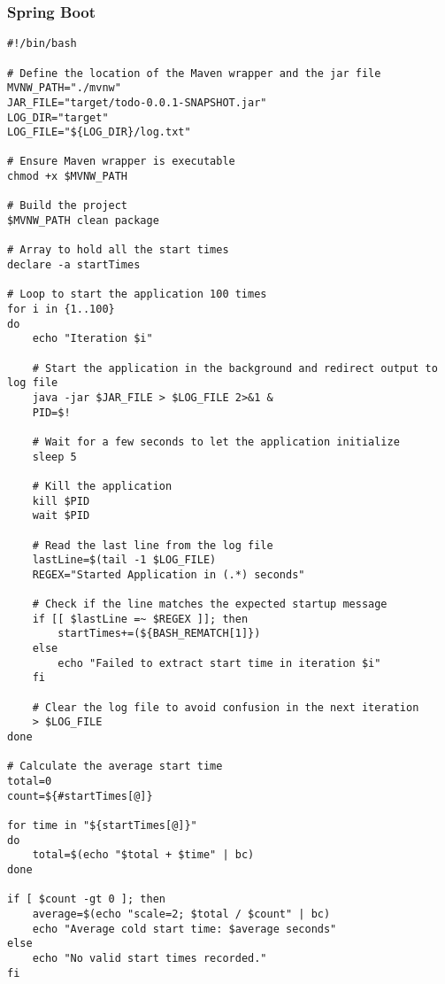 \documentclass[a4paper,titlepage]{article}
\begin{document}
\subsubsection{Spring Boot}
\begin{lstlisting}
#!/bin/bash

# Define the location of the Maven wrapper and the jar file
MVNW_PATH="./mvnw"
JAR_FILE="target/todo-0.0.1-SNAPSHOT.jar"
LOG_DIR="target"
LOG_FILE="${LOG_DIR}/log.txt"

# Ensure Maven wrapper is executable
chmod +x $MVNW_PATH

# Build the project
$MVNW_PATH clean package

# Array to hold all the start times
declare -a startTimes

# Loop to start the application 100 times
for i in {1..100}
do
	echo "Iteration $i"

	# Start the application in the background and redirect output to log file
	java -jar $JAR_FILE > $LOG_FILE 2>&1 &
	PID=$!

	# Wait for a few seconds to let the application initialize
	sleep 5

	# Kill the application
	kill $PID
	wait $PID

	# Read the last line from the log file
	lastLine=$(tail -1 $LOG_FILE)
	REGEX="Started Application in (.*) seconds"

	# Check if the line matches the expected startup message
	if [[ $lastLine =~ $REGEX ]]; then
		startTimes+=(${BASH_REMATCH[1]})
	else
		echo "Failed to extract start time in iteration $i"
	fi

	# Clear the log file to avoid confusion in the next iteration
	> $LOG_FILE
done

# Calculate the average start time
total=0
count=${#startTimes[@]}

for time in "${startTimes[@]}"
do
	total=$(echo "$total + $time" | bc)
done

if [ $count -gt 0 ]; then
	average=$(echo "scale=2; $total / $count" | bc)
	echo "Average cold start time: $average seconds"
else
	echo "No valid start times recorded."
fi
\end{lstlisting}
\end{document}

